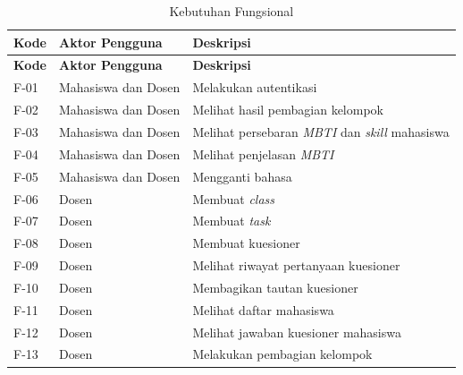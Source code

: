 \begin{longtable}{| b{}|p{}|p{}|}
	\caption{Kebutuhan Fungsional}
	\label{table:3.fungsional}                                                                              \\
	\hline
	\textbf{Kode} & \textbf{Aktor Pengguna} & \textbf{Deskripsi}                                            \\
	\hline
	\endfirsthead
	\hline
	\textbf{Kode} & \textbf{Aktor Pengguna} & \textbf{Deskripsi}                                            \\
	\hline
	\endhead
	F-01          & Mahasiswa dan Dosen     & Melakukan autentikasi                                         \\
	\hline
	F-02          & Mahasiswa dan Dosen     & Melihat hasil pembagian kelompok                              \\
	\hline
	F-03          & Mahasiswa dan Dosen     & Melihat persebaran \textit{MBTI} dan \textit{skill} mahasiswa \\
	\hline
	F-04          & Mahasiswa dan Dosen     & Melihat penjelasan \textit{MBTI}                              \\
	\hline
	F-05          & Mahasiswa dan Dosen     & Mengganti bahasa                                              \\
	\hline
	F-06          & Dosen                   & Membuat \textit{class}                                        \\
	\hline
	F-07          & Dosen                   & Membuat \textit{task}                                         \\
	\hline
	F-08          & Dosen                   & Membuat kuesioner                                             \\
	\hline
	F-09          & Dosen                   & Melihat riwayat pertanyaan kuesioner                          \\
	\hline
	F-10          & Dosen                   & Membagikan tautan kuesioner                                   \\
	\hline
	F-11          & Dosen                   & Melihat daftar mahasiswa                                      \\
	\hline
	F-12          & Dosen                   & Melihat jawaban kuesioner mahasiswa                           \\
	\hline
	F-13          & Dosen                   & Melakukan pembagian kelompok                                  \\

\end{longtable}
